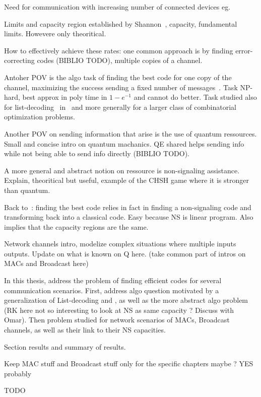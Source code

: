 Need for communication with increasing number of connected devices eg.

Limits and capacity region established by Shannon~\cite{Shannon48}, capacity, fundamental limits. Howevere only theoritical.

How to effectively achieve these rates: one common approach is by finding error-correcting codes (BIBLIO TODO), multiple copies of a channel.

Antoher POV is the algo task of finding the best code for one copy of the channel, maximizing the success sending a fixed number of messages~\cite{BF18}. Task NP-hard, best approx in poly time in $1-e^{-1}$ and cannot do better. Task studied also for list-decoding~\cite{Elias57,Wozencraft58} in~\cite{BFGG20} and more generally for a larger class of combinatorial optimization problems.

Another POV on sending information that arise is the use of quantum ressources. Small and concise intro on quantum machanics. QE shared helps sending info while not being able to send info directly (BIBLIO TODO).

A more general and abstract notion on ressource is non-signaling assistance. Explain, theoritical but useful, example of the CHSH game where it is stronger than quantum.

Back to~\cite{BF18}: finding the best code relies in fact in finding a non-signaling code and transforming back into a classical code. Easy because NS is linear program. Also implies that the capacity regions are the same.

Network channels intro, modelize complex situations where multiple inputs outputs. Update on what is known on Q here. (take common part of intros on MACs and Broadcast here)

In this thesis, address the problem of finding efficient codes for several communication scenarios. First, address algo question motivated by a generalization of List-decoding and \cite{BFGG20}, as well as the more abstract algo problem (RK here not so interesting to look at NS as same capacity ? Discuss with Omar). Then problem studied for network scenarios of MACs, Broadcast channels, as well as their link to their NS capacities.

Section results and summary of results.

Keep MAC stuff and Broadcast stuff only for the specific chapters maybe ? YES probably

\newpage

TODO
